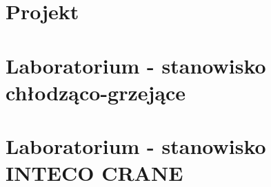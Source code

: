 \documentclass{mwrep}
\begin{document}
\part{Projekt}
%
%
%
%
%
\part{Laboratorium - stanowisko chłodząco-grzejące}



%
%
%
\part{Laboratorium - stanowisko INTECO CRANE}
%
%
%
%
%
%
%
\end{document}
